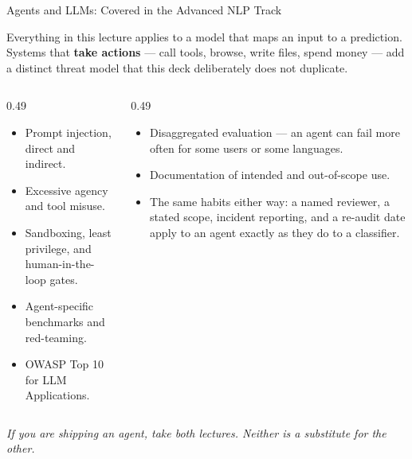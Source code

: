 \begin{frame}{Agents and LLMs: Covered in the Advanced NLP Track}

    Everything in this lecture applies to a model that maps an input to a prediction. Systems that
    \textbf{take actions} --- call tools, browse, write files, spend money --- add a distinct threat
    model that this deck deliberately does not duplicate.

    \vspace{0.9em}

    \begin{columns}[T]
        \begin{column}{0.49\textwidth}
            \begin{tcolorbox}[colback=gray!8, colframe=gray!60,
                              title={Phase 2B: AI Safety for Agents}]
                \scriptsize
                \begin{itemize}
                    \item Prompt injection, direct and indirect.
                    \item Excessive agency and tool misuse.
                    \item Sandboxing, least privilege, and human-in-the-loop gates.
                    \item Agent-specific benchmarks and red-teaming.
                    \item OWASP Top 10 for LLM Applications.
                \end{itemize}
            \end{tcolorbox}
        \end{column}
        \begin{column}{0.49\textwidth}
            \begin{tcolorbox}[colback=raiBlue!5, colframe=raiBlue!60, title=What carries over]
                \scriptsize
                \begin{itemize}
                    \item Disaggregated evaluation --- an agent can fail more often for some users
                          or some languages.
                    \item Documentation of intended and out-of-scope use.
                    \item The same habits either way: a named reviewer, a stated scope, incident
                          reporting, and a re-audit date apply to an agent exactly as they do to a
                          classifier.
                \end{itemize}
            \end{tcolorbox}
        \end{column}
    \end{columns}

    \vspace{0.7em}
    \centering
    \textit{If you are shipping an agent, take both lectures. Neither is a substitute for the other.}
\end{frame}
